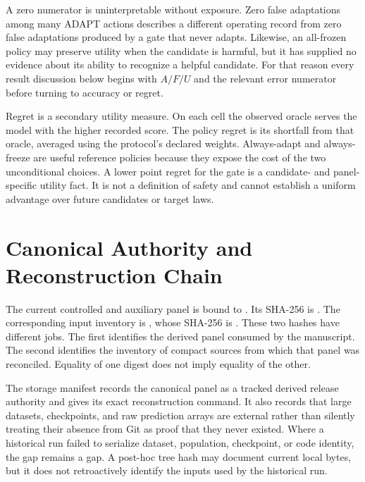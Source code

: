 A zero numerator is uninterpretable without exposure.  Zero false adaptations among many ADAPT
actions describes a different operating record from zero false adaptations produced by a gate that
never adapts.  Likewise, an all-frozen policy may preserve utility when the candidate is harmful,
but it has supplied no evidence about its ability to recognize a helpful candidate.  For that
reason every result discussion below begins with $A/F/U$ and the relevant error numerator before
turning to accuracy or regret.

Regret is a secondary utility measure.  On each cell the observed oracle serves the model with the
higher recorded score.  The policy regret is its shortfall from that oracle, averaged using the
protocol's declared weights.  Always-adapt and always-freeze are useful reference policies because
they expose the cost of the two unconditional choices.  A lower point regret for the gate is a
candidate- and panel-specific utility fact.  It is not a definition of safety and cannot establish
a uniform advantage over future candidates or target laws.

\section{Canonical Authority and Reconstruction Chain}
\label{fr:sec-canonical-authority}

{\raggedright The current controlled and auxiliary panel is bound to
.  Its SHA-256 is
\hashtext{\CanonicalPanelSHA}.  The corresponding input inventory is
, whose SHA-256 is
\hashtext{\SourceManifestSHA}.  These two hashes have different jobs.  The first identifies the
derived panel consumed by the manuscript.  The second identifies the inventory of compact sources
from which that panel was reconciled.  Equality of one digest does not imply equality of the other.\par}

The storage manifest records the canonical panel as a tracked derived release authority and gives
its exact reconstruction command.  It also records that large datasets, checkpoints, and raw
prediction arrays are external rather than silently treating their absence from Git as proof that
they never existed.  Where a historical run failed to serialize dataset, population, checkpoint,
or code identity, the gap remains a gap.  A post-hoc tree hash may document current local bytes, but
it does not retroactively identify the inputs used by the historical run.

